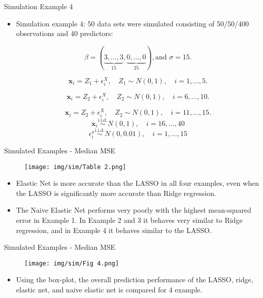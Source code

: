 \begin{frame}{Simulation Example 4}
\begin{itemize}
            \item Simulation example 4: 50 data sets were simulated consisting of 50/50/400 observations and 40 predictors:

$$\beta= ( \underbrace{3, \dots, 3}_{15}, \underbrace{0, \dots, 0}_{25}) , \text{and }\sigma=15.$$

$$\mathbf{x}_{i}=Z_1+\epsilon_i^X,\quad Z_1\sim N(0,1),\quad i=1,\dots,5.$$

$$\mathbf{x}_{i}=Z_2+\epsilon_i^X,\quad Z_2\sim N(0,1),\quad i=6,\dots,10.$$

$$\mathbf{x}_{i}=Z_2+\epsilon_i^X,\quad Z_2\sim N(0,1),\quad i=11,\dots,15.$$
 $$\mathbf{x}_{i}\overset{\mathrm{i.i.d.}}{\operatorname*{\sim}}N(0,1),\quad i=16,\dots,40$$
 $$\epsilon_i^x\stackrel{\mathrm{i.i.d.}}{\sim}N(0,0.01),\quad i=1,\dots,15$$
            
        \end{itemize}
\end{frame}

    \begin{frame}{Simulated Examples - Median MSE}
        \begin{figure}
            \centering
            \texttt{[image: img/sim/Table 2.png]}
        \end{figure}
        \begin{itemize}
            \item Elastic Net is more accurate than the LASSO in all four examples, even when the LASSO is significantly more accurate than Ridge regression.
            \item The Naive Elastic Net performs very poorly with the highest mean-squared error in Example 1. In Example 2 and 3 it behaves very similar to Ridge regression, and in Example 4 it behaves similar to the LASSO.
        \end{itemize}
    \end{frame}

    \begin{frame}{Simulated Examples - Median MSE}
        \begin{figure}
            \centering
            \texttt{[image: img/sim/Fig 4.png]}
        \end{figure}
        \begin{itemize}
            \item Using the box-plot, the overall prediction performance of the LASSO, ridge, elastic net, and naive elastic net is compared for 4 example.
        \end{itemize}
    \end{frame}

